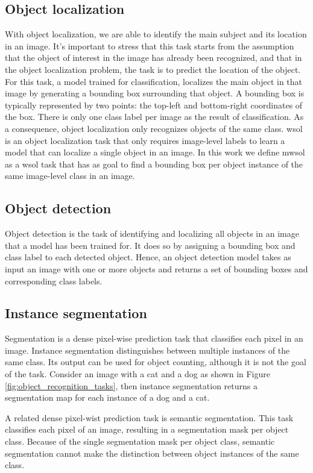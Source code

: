 \subsection{Object localization}
With object localization, we are able to identify the main subject and its location in an image. It's important to stress that this task starts from the assumption that the object of interest in the image has already been recognized, and that in the object localization problem, the task is to predict the location of the object. For this task, a model trained for classification, localizes the main object in that image by generating a bounding box surrounding that object. A bounding box is typically represented by two points: the top-left and bottom-right coordinates of the box. There is only one class label per image as the result of classification. As a consequence, object localization only recognizes objects of the same class. \acrfull{wsol} \cite{zhou2016cvpr} is an object localization task that only requires image-level labels to learn a model that can localize a single object in an image. In this work we define \acrfull{mwsol} as a \acrshort{wsol} task that has as goal to find a bounding box per object instance of the same image-level class in an image.

\subsection{Object detection}
Object detection is the task of identifying and localizing all objects in an image that a model has been trained for. It does so by assigning a bounding box and class label to each detected object. Hence, an object detection model takes as input an image with one or more objects and returns a set of bounding boxes and corresponding class labels.

\subsection{Instance segmentation}
Segmentation is a dense pixel-wise prediction task that classifies each pixel in an image. Instance segmentation distinguishes between multiple instances of the same class. Its output can be used for object counting, although it is not the goal of the task.
Consider an image with a cat and a dog as shown in Figure \ref{fig:object_recognition_tasks}, then instance segmentation returns a segmentation map for each instance of a dog and a cat.

A related dense pixel-wist prediction task is semantic segmentation. This task classifies each pixel of an image, resulting in a segmentation mask per object class. Because of the single segmentation mask per object class, semantic segmentation cannot make the distinction between object instances of the same class.

